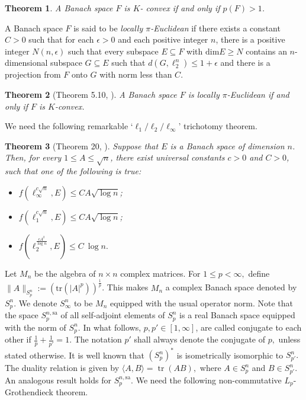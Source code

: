 \documentclass[a4paper,oneside,11pt, reqno]{amsart}
\numberwithin{equation}{section}
\newtheorem{theorem}{Theorem}[section]
\theoremstyle{plain}
\begin{document}
\begin{theorem} \label{thm:2.6} %
A Banach space $F$ is $K$- convex if and only if $p(F)>1$. 
\end{theorem} 
A Banach space $F$ is said to be {\it locally $\pi$-Euclidean} if there exists a constant $C>0$ such that for each $\epsilon>0$ and each positive integer $n$, there is a positive integer $N(n,\epsilon)$ such that every subspace $E\subseteq F$ with $\text{dim}E \geqslant N$ contains an $n$-dimensional subspace $G\subseteq E$ such that $d(G,\ell_2^n)\leqslant 1+\epsilon$ and there is a projection from $F$ onto $G$ with norm less than $C.$ %
\begin{theorem}[Theorem 5.10, \cite{Pis85}]\label{pieucli}
A Banach space $F$ is locally $\pi$-Euclidean if and only if $F$ is $K$-convex.
\end{theorem}
We need the following remarkable `$\ell_1/ \ell_2/ \ell_\infty$' trichotomy theorem.
\begin{theorem}[Theorem 20, \cite{XOR games and GT}]\label{trichotomy} Suppose that $E$ is a Banach space of dimension $n$. Then, for every $1\leqslant A\leqslant\sqrt{n}$, there exist universal constants $c>0$ and $C> 0$, such that one of the following is true:
\begin{itemize}
    \item[(i)] $f(\ell_\infty^{c\sqrt{n}}, E)\leqslant CA\sqrt{\log n}$;
    \item[(ii)]$f(\ell_1^{c\sqrt{n}}, E)\leqslant CA\sqrt{\log n}$; 
    \item[(iii)] $f(\ell_2^{\frac{cA^2}{\log{n}}}, E)\leqslant C\ {\log n}.$
\end{itemize}
\end{theorem}
Let $M_n$ be the algebra of $n\times n$ complex matrices. 
For $1\leqslant p<\infty,$
define $\|A\|_{S_p^n}:=(\text{tr}(|A|^p))^{\frac{1}{p}}$. This makes $M_n$ a complex Banach space denoted by $S_p^n$. We denote $S_\infty^n$ to be $M_n$ equipped with the usual operator norm. Note that the space $S_p^{n,\text{sa}}$ of all self-adjoint elements of $S_p^n$ is a real Banach space equipped with the norm of $S_p^n.$ 
In what follows, $p,p'\in [1,\infty]$, are called conjugate to each other if $\frac{1}{p}+\frac{1}{p'}=1.$ The notation $p'$ shall always denote the conjugate of $p,$ unless stated otherwise.  
It is well known that $(S_p^n)^*$ is isometrically isomorphic to $S_{p'}^n.$
The duality relation is given by $\langle A, B\rangle=\operatorname{tr}(AB),$ where $A\in S_p^n$ and $B\in S_{p'}^n.$ 
An analogous result holds for $S_p^{n,\text{sa}}.$ 
We need the following non-commutative $L_p$-Grothendieck theorem.
\end{document}
